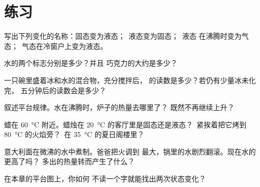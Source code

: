 \section{练习}

\begin{exercise}[$\star$]\label{exo:g4:changes-of-state:1}
写出下列变化的名称：固态变为液态；\ 液态变为固态；\ 液态
在沸腾时变为气态；\ 气态在冷窗户上变为液态。
\end{exercise}

\begin{exercise}[$\star$]\label{exo:g4:changes-of-state:2}
水的两个标志分别是多少？并且
巧克力的大约是多少？
\end{exercise}

\begin{exercise}[$\star$]\label{exo:g4:changes-of-state:3}
一只碗里盛着冰和水的混合物，充分搅拌后，
的读数是多少？若仍有少量冰未化完，
五分钟后的读数会是多少？
\end{exercise}

\begin{exercise}[$\star$]\label{exo:g4:changes-of-state:4}
叙述平台规律。水在沸腾时，炉子的热量去哪里了？
既然不再继续上升？
\end{exercise}

\begin{exercise}[$\star$]\label{exo:g4:changes-of-state:5}
蜡在 \qty{60}{\celsius} 附近。蜡烛在
\qty{20}{\celsius} 的客厅里是固态还是液态？\ 紧挨着把它烤到
\qty{80}{\celsius} 的火焰旁？\ 在 \qty{35}{\celsius} 的夏日阁楼里？
\end{exercise}

\begin{exercise}[$\star$]\label{exo:g4:changes-of-state:6}
意大利面在微沸的水中煮制。爸爸把火调到
最大，锅里的水剧烈翻滚。现在水的更高了吗？
多出的热量转而产生了什么？
\end{exercise}

\begin{exercise}[$\star$]\label{exo:g4:changes-of-state:7}
在本章的平台图上，你如何
不读一个字就能找出两次状态变化？
\end{exercise}

